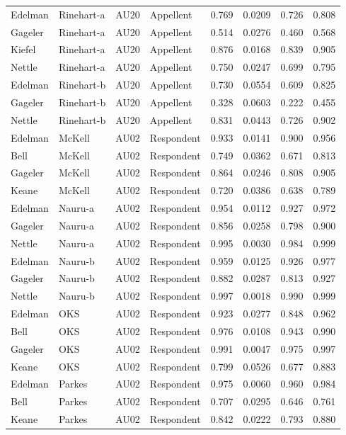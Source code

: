 \documentclass{monashthesis}
\begin{document}
\begin{center}
\begin{longtable}{llllllll}
Edelman & Rinehart-a & AU20 & Appellent & 0.769 & 0.0209 & 0.726 & 0.808 \\
Gageler & Rinehart-a & AU20 & Appellent & 0.514 & 0.0276 & 0.460 & 0.568 \\
Kiefel & Rinehart-a & AU20 & Appellent & 0.876 & 0.0168 & 0.839 & 0.905 \\
Nettle & Rinehart-a & AU20 & Appellent & 0.750 & 0.0247 & 0.699 & 0.795 \\
Edelman & Rinehart-b & AU20 & Appellent & 0.730 & 0.0554 & 0.609 & 0.825 \\
Gageler & Rinehart-b & AU20 & Appellent & 0.328 & 0.0603 & 0.222 & 0.455 \\
Nettle & Rinehart-b & AU20 & Appellent & 0.831 & 0.0443 & 0.726 & 0.902 \\
Edelman & McKell & AU02 & Respondent & 0.933 & 0.0141 & 0.900 & 0.956 \\
Bell & McKell & AU02 & Respondent & 0.749 & 0.0362 & 0.671 & 0.813 \\
Gageler & McKell & AU02 & Respondent & 0.864 & 0.0246 & 0.808 & 0.905 \\
Keane & McKell & AU02 & Respondent & 0.720 & 0.0386 & 0.638 & 0.789 \\
Edelman & Nauru-a & AU02 & Respondent & 0.954 & 0.0112 & 0.927 & 0.972 \\
Gageler & Nauru-a & AU02 & Respondent & 0.856 & 0.0258 & 0.798 & 0.900 \\
Nettle & Nauru-a & AU02 & Respondent & 0.995 & 0.0030 & 0.984 & 0.999 \\
Edelman & Nauru-b & AU02 & Respondent & 0.959 & 0.0125 & 0.926 & 0.977 \\
Gageler & Nauru-b & AU02 & Respondent & 0.882 & 0.0287 & 0.813 & 0.927 \\
Nettle & Nauru-b & AU02 & Respondent & 0.997 & 0.0018 & 0.990 & 0.999 \\
Edelman & OKS & AU02 & Respondent & 0.923 & 0.0277 & 0.848 & 0.962 \\
Bell & OKS & AU02 & Respondent & 0.976 & 0.0108 & 0.943 & 0.990 \\
Gageler & OKS & AU02 & Respondent & 0.991 & 0.0047 & 0.975 & 0.997 \\
Keane & OKS & AU02 & Respondent & 0.799 & 0.0526 & 0.677 & 0.883 \\
Edelman & Parkes & AU02 & Respondent & 0.975 & 0.0060 & 0.960 & 0.984 \\
Bell & Parkes & AU02 & Respondent & 0.707 & 0.0295 & 0.646 & 0.761 \\
Keane & Parkes & AU02 & Respondent & 0.842 & 0.0222 & 0.793 & 0.880 \\

\end{longtable}
\end{center}
\end{document}
